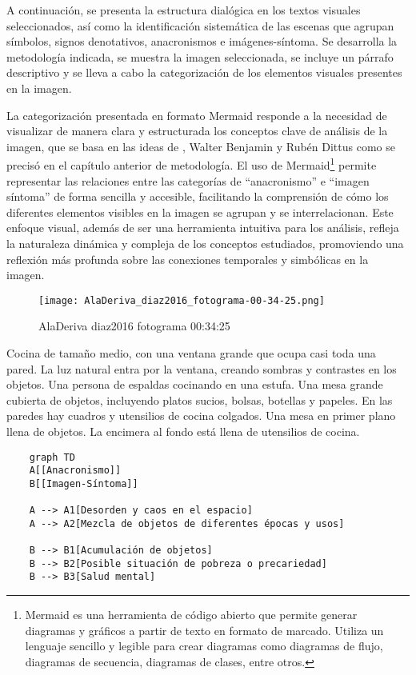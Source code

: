 A continuación, se presenta la estructura dialógica en los textos visuales seleccionados, así como la identificación sistemática de las escenas que agrupan símbolos, signos denotativos, anacronismos e imágenes-síntoma. Se desarrolla la metodología indicada, se muestra la imagen seleccionada, se incluye un párrafo descriptivo y se lleva a cabo la categorización de los elementos visuales presentes en la imagen.

La categorización presentada en formato Mermaid responde a la necesidad de visualizar de manera clara y estructurada los conceptos clave de análisis de la imagen, que se basa en las ideas de \parencite{DidiHuberman2011}, Walter Benjamin y Rubén Dittus como se precisó en el capítulo anterior de metodología. El uso de Mermaid\footnote{Mermaid es una herramienta de código abierto que permite generar diagramas y gráficos a partir de texto en formato de marcado. Utiliza un lenguaje sencillo y legible para crear diagramas como diagramas de flujo, diagramas de secuencia, diagramas de clases, entre otros.} permite representar las relaciones entre las categorías de ``anacronismo'' e ``imagen síntoma'' de forma sencilla y accesible, facilitando la comprensión de cómo los diferentes elementos visibles en la imagen se agrupan y se interrelacionan. Este enfoque visual, además de ser una herramienta intuitiva para los análisis, refleja la naturaleza dinámica y compleja de los conceptos estudiados, promoviendo una reflexión más profunda sobre las conexiones temporales y simbólicas en la imagen.


\clearpage
\begin{figure}[h!]
    \centering
    \texttt{[image: AlaDeriva\_diaz2016\_fotograma-00-34-25.png]}
    \caption{AlaDeriva diaz2016 fotograma 00:34:25}
    \label{fig:AlaDeriva_diaz2016_fotograma_00_34_25}
\end{figure}

Cocina de tamaño medio, con una ventana grande que ocupa casi toda una pared. La luz natural entra por la ventana, creando sombras y contrastes en los objetos. Una persona de espaldas cocinando en una estufa. Una mesa grande cubierta de objetos, incluyendo platos sucios, bolsas, botellas y papeles. En las paredes hay cuadros y utensilios de cocina colgados. Una mesa en primer plano llena de objetos. La encimera al fondo está llena de utensilios de cocina. \parencite[fotograma: 00:34:25]{AlaDeriva_diaz2016}

\small
\begin{verbatim}
    graph TD
    A[[Anacronismo]]
    B[[Imagen-Síntoma]]

    A --> A1[Desorden y caos en el espacio]
    A --> A2[Mezcla de objetos de diferentes épocas y usos]

    B --> B1[Acumulación de objetos]
    B --> B2[Posible situación de pobreza o precariedad]
    B --> B3[Salud mental]
\end{verbatim}
\normalsize

